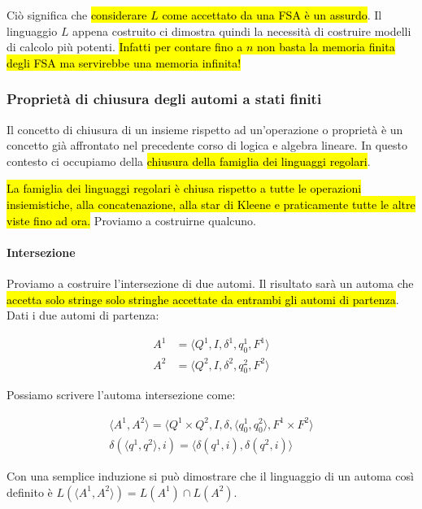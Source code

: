 \documentclass[a4paper,11pt,oneside]{article}
\theoremstyle{plain}
\theoremstyle{definition}
\theoremstyle{remark}
\begin{document}
Ciò significa che \hl{considerare $L$ come accettato da una FSA è un assurdo}.
Il linguaggio $L$ appena costruito ci dimostra quindi la necessità di costruire
modelli di calcolo più potenti. \hl{Infatti per contare fino a $n$ non basta la
memoria finita degli FSA ma servirebbe una memoria infinita!}

\subsubsection{Proprietà di chiusura degli automi a stati finiti}\label{sec:chiusura-fsa}

Il concetto di chiusura di un insieme rispetto ad un'operazione o proprietà è
un concetto già affrontato nel precedente corso di logica e algebra lineare. In
questo contesto ci occupiamo della \hl{chiusura della famiglia dei linguaggi
regolari}.

\hl{La famiglia dei linguaggi regolari è chiusa rispetto a tutte le operazioni
insiemistiche, alla concatenazione, alla star di Kleene e praticamente tutte le
altre viste fino ad ora.} Proviamo a costruirne qualcuno.

\paragraph{Intersezione} Proviamo a costruire l'intersezione di due automi. Il
risultato sarà un automa che \hl{accetta solo stringe solo stringhe accettate da
entrambi gli automi di partenza}. Dati i due automi di partenza:

\[
  \begin{aligned}
    A^1 &= \langle Q^1, I, \delta^1, q_0^1, F^1 \rangle \\
    A^2 &= \langle Q^2, I, \delta^2, q_0^2, F^2 \rangle
  \end{aligned}
\]

Possiamo scrivere l'automa intersezione come:

\begin{gather}
  \langle A^1, A^2 \rangle = \langle Q^1 \times Q^2, I, \delta,
    \langle q_0^1, q_0^2 \rangle, F^1 \times F^2 \rangle\label{eqn:automa-intersezione} \\
  \delta(\langle q^1, q^2 \rangle, i) = \langle \delta(q^1, i),
    \delta(q^2, i) \rangle
\end{gather}

Con una semplice induzione si può dimostrare che il linguaggio di un automa così
definito è $L(\langle A^1, A^2 \rangle) = L(A^1) \cap L(A^2)$.
\end{document}
